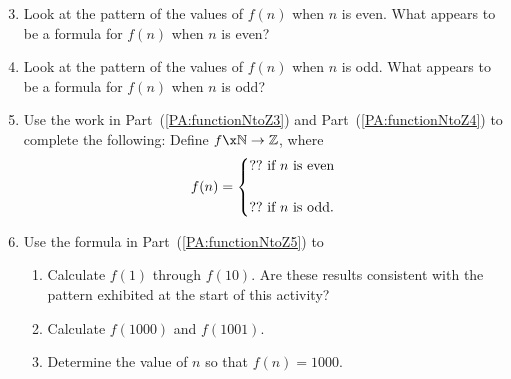 \begin{previewactivity}
\begin{enumerate} \setcounter{enumi}{2}
\item Look at the pattern of the values of $f ( n )$ when $n$ is even.  What appears to be a formula for $f ( n )$ when $n$ is even? 
\label{PA:functionNtoZ3}%

\item Look at the pattern of the values of $f ( n )$ when $n$ is odd.  What appears to be a formula for $f ( n )$ when $n$ is odd? 
\label{PA:functionNtoZ4}%

\item Use the work in Part~(\ref{PA:functionNtoZ3}) and Part~(\ref{PA:functionNtoZ4}) to complete the following:  Define $f\x \mathbb{N} \to \mathbb{Z}$, where
\[
f ( n ) = \left\{ \begin{gathered}
  ?? \text{  if  }n \text{ is even} \hfill \\
\\
  ?? \text{  if  }n \text{ is odd}. \hfill \\ 
\end{gathered}  \right.
\]
\label{PA:functionNtoZ5}%

\item Use the formula in Part~(\ref{PA:functionNtoZ5}) to
\begin{enumerate}
\item Calculate $f ( 1 )$ through $f ( 10 )$.  Are these results consistent with the pattern exhibited at the start of this activity?

\item Calculate $f ( 1000 )$ and $f ( 1001 )$.

\item Determine the value of $n$ so that $f ( n ) = 1000$.
\end{enumerate}
\end{enumerate} 
\end{previewactivity}
\hbreak

\endinput
